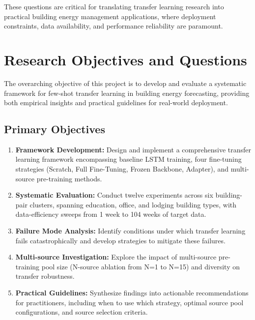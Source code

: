 \documentclass[12pt,a4paper]{report}
\begin{document}
These questions are critical for translating transfer learning research into practical building energy management applications, where deployment constraints, data availability, and performance reliability are paramount.

\section{Research Objectives and Questions}

The overarching objective of this project is to develop and evaluate a systematic framework for few-shot transfer learning in building energy forecasting, providing both empirical insights and practical guidelines for real-world deployment.

\subsection{Primary Objectives}

\begin{enumerate}
    \item \textbf{Framework Development:} Design and implement a comprehensive transfer learning framework encompassing baseline LSTM training, four fine-tuning strategies (Scratch, Full Fine-Tuning, Frozen Backbone, Adapter), and multi-source pre-training methods.
    
    \item \textbf{Systematic Evaluation:} Conduct twelve experiments across six building-pair clusters, spanning education, office, and lodging building types, with data-efficiency sweeps from 1 week to 104 weeks of target data.
    
    \item \textbf{Failure Mode Analysis:} Identify conditions under which transfer learning fails catastrophically and develop strategies to mitigate these failures.
    
    \item \textbf{Multi-source Investigation:} Explore the impact of multi-source pre-training pool size (N-source ablation from N=1 to N=15) and diversity on transfer robustness.
    
    \item \textbf{Practical Guidelines:} Synthesize findings into actionable recommendations for practitioners, including when to use which strategy, optimal source pool configurations, and source selection criteria.
\end{enumerate}
\end{document}
